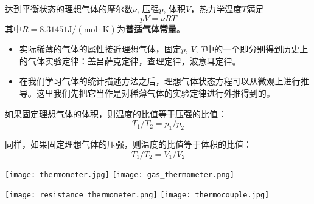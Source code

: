 \documentclass[CJK]{beamer}
\begin{document}
\begin{frame}
\bch
{\large 达到平衡状态的理想气体的摩尔数$\nu$, 压强$p$, 体积$V$，热力学温度$T$满足
{\color{blue}
$$p V = \nu RT$$
}
其中$R=8.31451 \mathrm{J/(mol\cdot K)}$为{\bf 普适气体常量}。
}

{\small
\begin{itemize}
\item{实际稀薄的气体的属性接近理想气体，固定$p$, $V$, $T$中的一个即分别得到历史上的气体实验定律：盖吕萨克定律，查理定律，波意耳定律。}
\item{在我们学习气体的统计描述方法之后，理想气体状态方程可以从微观上进行推导。这里我们先把它当作是对稀薄气体的实验定律进行外推得到的。}
\end{itemize}
}
\ech
\end{frame}


\begin{frame}
\bch
如果固定理想气体的体积，则温度的比值等于压强的比值：
$$T_1/T_2 = p_1/p_2$$

\skipline
同样，如果固定理想气体的压强，则温度的比值等于体积的比值：
$$T_1/T_2 = V_1/V_2$$


\ech
\end{frame}




\begin{frame}
\texttt{[image: thermometer.jpg]}
\hspace{0.2in}
\texttt{[image: gas\_thermometer.png]}

\texttt{[image: resistance\_thermometer.png]}
\hspace{0.2in}
\texttt{[image: thermocouple.jpg]}
\end{frame}
\end{document}
